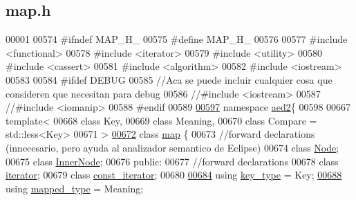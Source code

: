 \hypertarget{map_8h_source}{}\subsection{map.\+h}

\begin{DoxyCode}
00001 
00574 \textcolor{preprocessor}{#ifndef MAP\_H\_}
00575 \textcolor{preprocessor}{#define MAP\_H\_}
00576 
00577 \textcolor{preprocessor}{#include <functional>}
00578 \textcolor{preprocessor}{#include <iterator>}
00579 \textcolor{preprocessor}{#include <utility>}
00580 \textcolor{preprocessor}{#include <cassert>}
00581 \textcolor{preprocessor}{#include <algorithm>}
00582 \textcolor{preprocessor}{#include <iostream>}
00583 
00584 \textcolor{preprocessor}{#ifdef DEBUG}
00585 \textcolor{comment}{//Aca se puede incluir cualquier cosa que consideren que necesitan para debug}
00586 \textcolor{comment}{//#include <iostream>}
00587 \textcolor{comment}{//#include <iomanip>}
00588 \textcolor{preprocessor}{#endif}
00589 
\hyperlink{namespaceaed2}{00597} \textcolor{keyword}{namespace }\hyperlink{namespaceaed2}{aed2}\{
00598 
00667 \textcolor{keyword}{template}<
00668   \textcolor{keyword}{class }Key,
00669   \textcolor{keyword}{class }Meaning,
00670   \textcolor{keyword}{class }Compare = std::less<Key>
00671 >
\hyperlink{classaed2_1_1map}{00672} \textcolor{keyword}{class }\hyperlink{classaed2_1_1map}{map} \{
00673     \textcolor{comment}{//forward declarations (innecesario, pero ayuda al analizador semantico de Eclipse)}
00674     \textcolor{keyword}{class }\hyperlink{structaed2_1_1map_1_1Node}{Node};
00675     \textcolor{keyword}{class }\hyperlink{structaed2_1_1map_1_1InnerNode}{InnerNode};
00676 \textcolor{keyword}{public}:
00677     \textcolor{comment}{//forward declarations}
00678     \textcolor{keyword}{class }\hyperlink{classaed2_1_1map_1_1iterator}{iterator};
00679     \textcolor{keyword}{class }\hyperlink{classaed2_1_1map_1_1const__iterator}{const\_iterator};
00680 
\hyperlink{classaed2_1_1map_a4273e8812e7105a618df58a2c8b72b7d_a4273e8812e7105a618df58a2c8b72b7d}{00684}     \textcolor{keyword}{using} \hyperlink{classaed2_1_1map_a4273e8812e7105a618df58a2c8b72b7d_a4273e8812e7105a618df58a2c8b72b7d}{key\_type} = Key;
\hyperlink{classaed2_1_1map_aa3e34bf624f3009884a71b18f4ddae40_aa3e34bf624f3009884a71b18f4ddae40}{00688}     \textcolor{keyword}{using} \hyperlink{classaed2_1_1map_aa3e34bf624f3009884a71b18f4ddae40_aa3e34bf624f3009884a71b18f4ddae40}{mapped\_type} = Meaning;

\end{DoxyCode}

